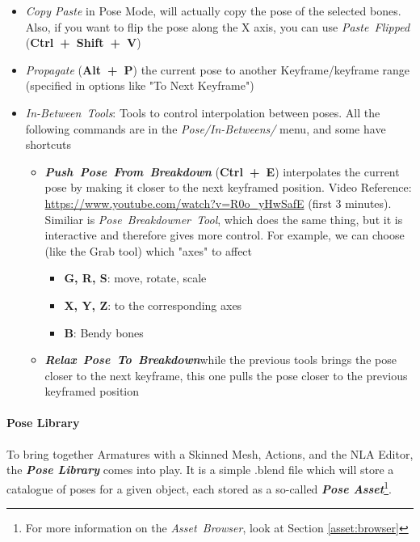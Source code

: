 \documentclass{article}
\begin{document}
\begin{itemize}[topsep=0pt, noitemsep]
    \item \textit{Copy Paste} in Pose Mode, will actually copy the pose of the selected bones. Also, if you want to flip the pose along the X axis, you can use \mbox{\textit{Paste Flipped}} (\mbox{\textbf{Ctrl + Shift + V}})
    \item \textit{Propagate} (\mbox{\textbf{Alt + P}}) the current pose to another Keyframe/keyframe range (specified in options like "To Next Keyframe")
    \item \mbox{\textit{In-Between Tools}}: Tools to control interpolation between poses. All the following commands are in the \mbox{\textit{Pose/In-Betweens/}} menu, and some have shortcuts
    \begin{itemize}[noitemsep]
        \item \mbox{\textbf{\textit{Push Pose From Breakdown}}} (\mbox{\textbf{Ctrl + E}}) interpolates the current pose by making it closer to the next keyframed position. 
        Video Reference: \href{https://www.youtube.com/watch?v=R0o_yHwSafE}{https://www.youtube.com/watch?v=R0o\_yHwSafE} (first 3 minutes).\\ Similiar is \mbox{\textit{Pose Breakdowner Tool}}, which does 
        the same thing, but it is interactive and therefore gives more control. For example, we can choose (like the Grab tool) which "axes" to affect
        \begin{itemize}[topsep=0pt, noitemsep]
            \item \textbf{G, R, S}: move, rotate, scale
            \item \textbf{X, Y, Z}: to the corresponding axes
            \item \textbf{B}: Bendy bones
        \end{itemize}
        \item \mbox{\textbf{\textit{Relax Pose To Breakdown}}}\footnotemark while the previous tools brings the pose closer to the next keyframe, this one pulls the pose closer to the previous keyframed position
    \end{itemize}
\end{itemize}

\paragraph{Pose Library}
To bring together Armatures with a Skinned Mesh, Actions, and the NLA Editor, the \textbf{\textit{Pose Library}} comes into play. It is a simple .blend file which will store a catalogue of poses for a 
given object, each stored as a so-called \textit{\textbf{Pose Asset}}\footnote{For more information on the \mbox{\textit{Asset Browser}}, look at Section \ref{asset:browser}}.\par
\end{document}
